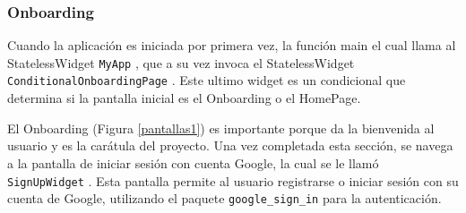 





\subsubsection*{Onboarding}

Cuando la aplicación es iniciada por primera vez, la función main %
el cual llama al StatelessWidget \texttt{MyApp} 
, que a su vez invoca el StatelessWidget \texttt{ConditionalOnboardingPage} %
. Este ultimo widget es un condicional que determina si la pantalla inicial es el Onboarding %
o el HomePage. %

El Onboarding (Figura \ref{pantallas1}) es importante porque da la bienvenida al usuario y es la carátula del proyecto. Una vez completada esta sección, se navega a la pantalla de iniciar sesión con cuenta Google, la cual se le llamó \texttt{SignUpWidget} %
. Esta pantalla permite al usuario registrarse o iniciar sesión con su cuenta de Google, utilizando el paquete \texttt{google\_sign\_in} para la autenticación.

